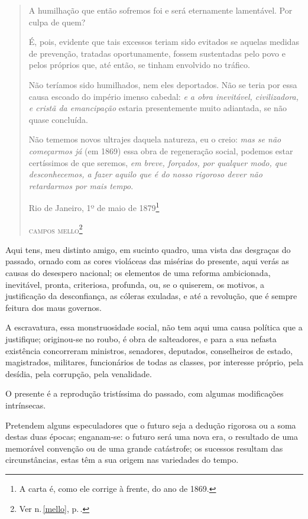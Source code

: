 \begin{quote}
A humilhação que então sofremos foi e será eternamente lamentável. Por
culpa de quem?

É, pois, evidente que tais excessos teriam sido evitados se aquelas
medidas de prevenção, tratadas oportunamente, fossem sustentadas pelo
povo e pelos próprios que, até então, se tinham envolvido no tráfico.

Não teríamos sido humilhados, nem eles deportados. Não se teria por essa
causa escoado do império imenso cabedal: \emph{e a obra inevitável,
civilizadora, e cristã da emancipação} estaria presentemente muito
adiantada, se não quase concluída.

Não tememos novos ultrajes daquela natureza, eu o creio: \emph{mas se
não começarmos já} (em 1869) essa obra de regeneração social, podemos
estar certíssimos de que seremos, \emph{em breve, forçados, por qualquer
modo, que desconhecemos, a fazer aquilo que é do nosso rigoroso dever
não retardarmos por mais tempo}.\medskip

\hfill{}Rio de Janeiro, 1º de maio de 1879\footnote{A carta é, como ele corrige à
  frente, do ano de 1869.}

\hfill\textsc{campos mello}\footnote{Ver n.\,\ref{mello}, p.\,\pageref{mello}.}
\end{quote}  

Aqui tens, meu distinto amigo, em sucinto quadro, uma vista das
desgraças do passado, ornado com as cores violáceas das misérias do
presente, aqui verás as causas do desespero nacional; os elementos de
uma reforma ambicionada, inevitável, pronta, criteriosa, profunda, ou,
se o quiserem, os motivos, a justificação da desconfiança, as cóleras
exuladas, e até a revolução, que é sempre feitura dos maus governos.

A escravatura, essa monstruosidade social, não tem aqui uma causa
política que a justifique; originou-se no roubo, é obra de salteadores,
e para a sua nefasta existência concorreram ministros, senadores,
deputados, conselheiros de estado, magistrados, militares, funcionários
de todas as classes, por interesse próprio, pela desídia, pela
corrupção, pela venalidade.

O presente é a reprodução tristíssima do passado, com algumas
modificações intrínsecas.

Pretendem alguns especuladores que o futuro seja a dedução rigorosa ou a
soma destas duas épocas; enganam-se: o futuro será uma nova era, o
resultado de uma memorável convenção ou de uma grande catástrofe; os
sucessos resultam das circunstâncias, estas têm a sua origem nas
variedades do tempo.


